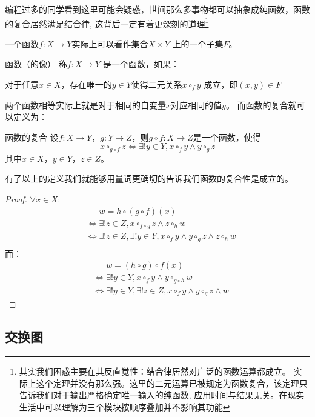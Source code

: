 编程过多的同学看到这里可能会疑惑，世间那么多事物都可以抽象成纯函数，函数的复合居然满足结合律,
这背后一定有着更深刻的道理\footnote{其实我们困惑主要在其反直觉性：结合律居然对广泛的函数运算都成立。
    实际上这个定理并没有那么强。这里的二元运算已被规定为函数复合，该定理只告诉我们对于输出严格确定唯一输入的纯函数,
应用时间与结果无关。在现实生活中可以理解为三个模块按顺序叠加并不影响其功能}

一个函数\(f: X \to Y\)实际上可以看作集合\(X \times Y\) 上的一个子集\(F\)。
\begin{definition}{函数（的像）}
    称\(f: X\to Y\) 是一个函数，如果：

    对于任意\(x\in X\)，存在唯一的\(y\in Y\)使得二元关系\(x \circ_{f} y\)
    成立，即\((x,y)\in F\)
\end{definition}

两个函数相等实际上就是对于相同的自变量\(x\)对应相同的值\(y\)。
而函数的复合就可以定义为：
\begin{definition}{函数的复合}
    设\(f: X\to Y\)，\(g: Y\to Z\)，则\(g\circ f: X \to Z\)是一个函数，使得
    \[
        x \circ_{g\circ f} z \iff \exists! y \in Y, x
        \circ_{f} y \land y \circ_{g} z
    \]
    其中\(x\in X\)，\(y\in Y\)，\(z\in Z\)。
    \end{definition}
    有了以上的定义我们就能够用量词更确切的告诉我们函数的复合性是成立的。
\begin{proof}
    \(\forall x \in X\):
    \begin{align*}
        &\mathrel{\phantom{\iff}}w=h \circ(g\circ f)(x) \\
        &\iff \exists! z \in Z, x \circ_{f\circ g} z \land z
        \circ_{h} w\\
        &\iff \exists! z \in Z, \exists! y \in Y, x
        \circ_{f} y \land y \circ_{g} z \land z
        \circ_{h} w\\
    \end{align*}
    而：
    \begin{align*}
        &\mathrel{\phantom{\iff}}w=(h\circ g)\circ f(x) \\
        &\iff \exists! y \in Y, x \circ_{f} y \land y
        \circ_{g \circ h} w\\
        &\iff \exists! y \in Y, \exists! z \in Z, x
        \circ_{f} y \land y
        \circ_{g} z \land w
    \end{align*}
\end{proof}

\subsection{交换图}

